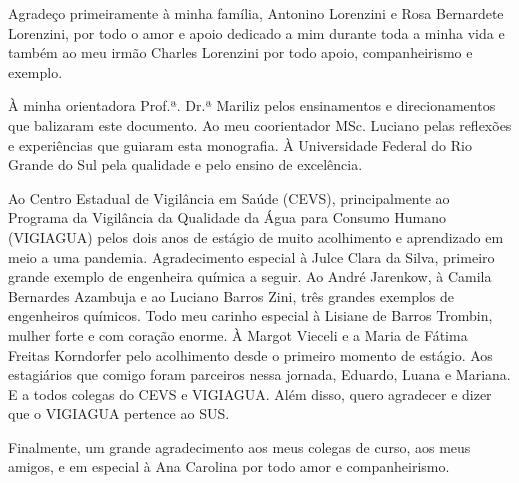 \begin{agradecimentos}

    Agradeço primeiramente à minha família, Antonino Lorenzini e Rosa Bernardete Lorenzini, por todo o amor e apoio dedicado a mim durante toda a minha vida e também ao meu irmão Charles Lorenzini por todo apoio, companheirismo e exemplo.
    
    À minha orientadora Prof.ª. Dr.ª Mariliz pelos ensinamentos e direcionamentos que balizaram este documento. Ao meu coorientador MSc. Luciano pelas
    reflexões e experiências que guiaram esta monografia. À Universidade Federal do Rio Grande do Sul pela qualidade e pelo ensino de excelência.
    
    Ao Centro Estadual de Vigilância em Saúde (CEVS), principalmente ao Programa da Vigilância da Qualidade da Água para Consumo Humano (VIGIAGUA) pelos dois anos de estágio de muito acolhimento e aprendizado em meio a uma pandemia. Agradecimento especial à Julce Clara da Silva, primeiro grande exemplo de engenheira química a seguir. Ao André Jarenkow, à Camila Bernardes Azambuja e ao Luciano Barros Zini, três grandes exemplos de engenheiros químicos. Todo meu carinho especial à Lisiane de Barros Trombin, mulher forte e com coração enorme. À Margot Vieceli e a Maria de Fátima Freitas Korndorfer pelo acolhimento desde o primeiro momento de estágio. Aos estagiários que comigo foram parceiros nessa jornada, Eduardo, Luana e Mariana. E a todos colegas do CEVS e VIGIAGUA. Além disso, quero agradecer e dizer que o VIGIAGUA pertence ao SUS.
    
    Finalmente, um grande agradecimento aos meus colegas de curso, aos meus amigos, e em especial à Ana Carolina por todo amor e companheirismo.
    
    
    
    
    
    
\end{agradecimentos}


